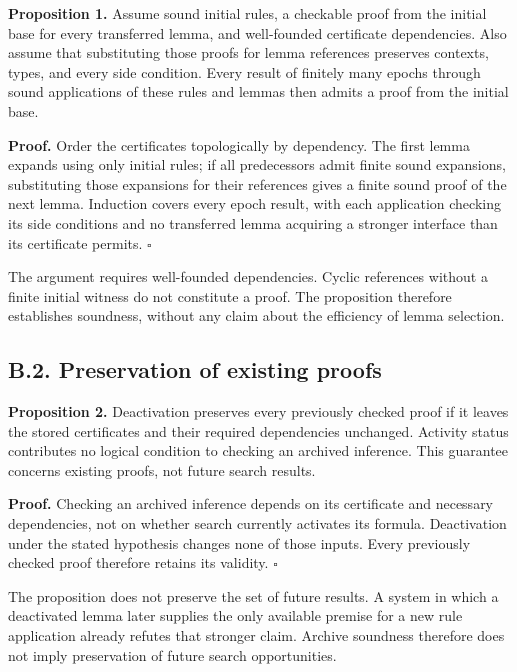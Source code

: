 \documentclass[pdflatex,sn-basic,Numbered]{sn-jnl}
\begin{document}
\textbf{Proposition 1.} Assume sound initial rules, a checkable proof from the initial base for every transferred lemma, and well-founded certificate dependencies. Also assume that substituting those proofs for lemma references preserves contexts, types, and every side condition. Every result of finitely many epochs through sound applications of these rules and lemmas then admits a proof from the initial base.

\textbf{Proof.} Order the certificates topologically by dependency. The first lemma expands using only initial rules; if all predecessors admit finite sound expansions, substituting those expansions for their references gives a finite sound proof of the next lemma. Induction covers every epoch result, with each application checking its side conditions and no transferred lemma acquiring a stronger interface than its certificate permits. \(\square\)

The argument requires well-founded dependencies. Cyclic references without a finite initial witness do not constitute a proof. The proposition therefore establishes soundness, without any claim about the efficiency of lemma selection.

\subsection*{B.2. Preservation of existing proofs}\label{b.2.-preservation-of-existing-proofs}

\textbf{Proposition 2.} Deactivation preserves every previously checked proof if it leaves the stored certificates and their required dependencies unchanged. Activity status contributes no logical condition to checking an archived inference. This guarantee concerns existing proofs, not future search results.

\textbf{Proof.} Checking an archived inference depends on its certificate and necessary dependencies, not on whether search currently activates its formula. Deactivation under the stated hypothesis changes none of those inputs. Every previously checked proof therefore retains its validity. \(\square\)

The proposition does not preserve the set of future results. A system in which a deactivated lemma later supplies the only available premise for a new rule application already refutes that stronger claim. Archive soundness therefore does not imply preservation of future search opportunities.
\end{document}
